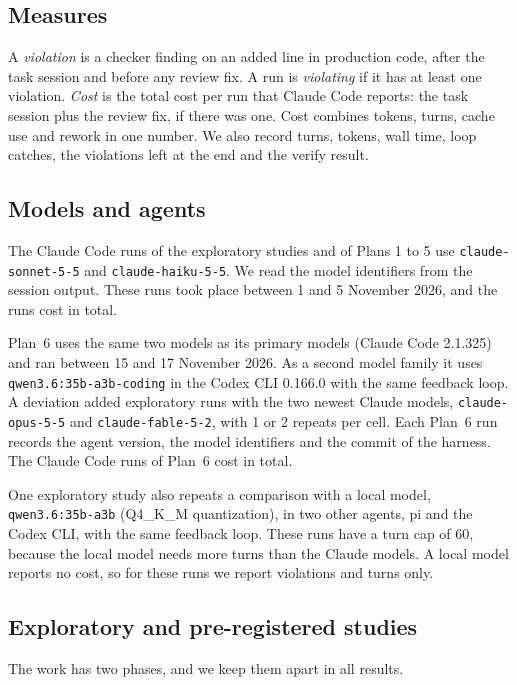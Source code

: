 \documentclass[pdflatex,sn-mathphys-num]{sn-jnl}
\begin{document}
\subsection{Measures}

A \emph{violation} is a checker finding on an added line in production code, after the task session and before any review fix.
A run is \emph{violating} if it has at least one violation.
\emph{Cost} is the total cost per run that Claude Code reports: the task session plus the review fix, if there was one.
Cost combines tokens, turns, cache use and rework in one number.
We also record turns, tokens, wall time, loop catches, the violations left at the end and the verify result.

\subsection{Models and agents}

The Claude Code runs of the exploratory studies and of Plans 1 to 5 use \texttt{claude-sonnet-5-5} and \texttt{claude-haiku-5-5}.
We read the model identifiers from the session output.
These runs took place between 1 and 5 November 2026, and the \NClaudeRuns{} runs cost \TotalCost{} in total.

Plan~6 uses the same two models as its primary models (Claude Code 2.1.325) and ran between 15 and 17 November 2026.
As a second model family it uses \texttt{qwen3.6:35b-a3b-coding} in the Codex CLI 0.166.0 with the same feedback loop.
A deviation added exploratory runs with the two newest Claude models, \texttt{claude-opus-5-5} and \texttt{claude-fable-5-2}, with 1 or 2 repeats per cell.
Each Plan~6 run records the agent version, the model identifiers and the commit of the harness.
The Claude Code runs of Plan~6 cost \PSixCost{} in total.

One exploratory study also repeats a comparison with a local model, \texttt{qwen3.6:35b-a3b} (Q4\_K\_M quantization), in two other agents, pi and the Codex CLI, with the same feedback loop.
These runs have a turn cap of 60, because the local model needs more turns than the Claude models.
A local model reports no cost, so for these runs we report violations and turns only.

\subsection{Exploratory and pre-registered studies}

The work has two phases, and we keep them apart in all results.
\end{document}
